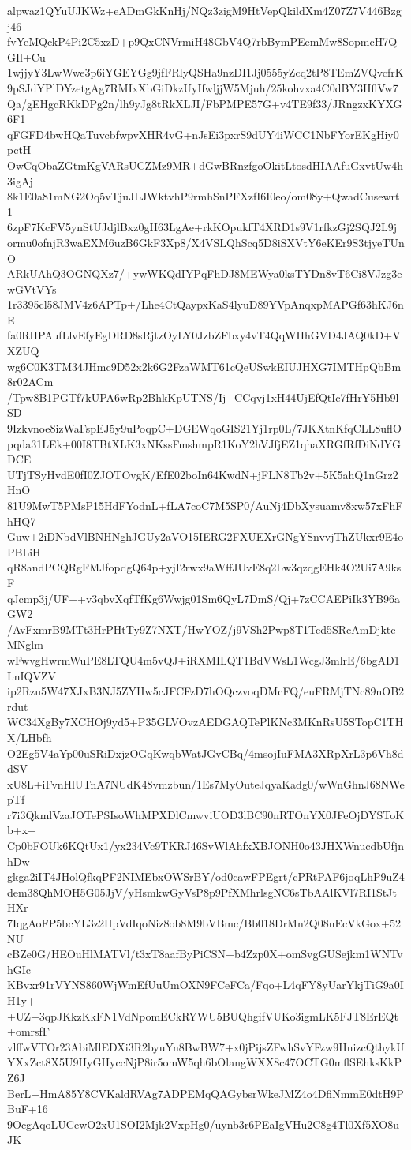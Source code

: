 alpwaz1QYuUJKWz+eADmGkKnHj/NQz3zigM9HtVepQkildXm4Z07Z7V446Bzgj46
fvYeMQckP4Pi2C5xzD+p9QxCNVrmiH48GbV4Q7rbBymPEemMw8SopmcH7QGIl+Cu
1wjjyY3LwWwe3p6iYGEYGg9jfFRlyQSHa9nzDI1Jj0555yZcq2tP8TEmZVQvcfrK
9pSJdYPlDYzetgAg7RMIxXbGiDkzUyIfwljjW5Mjuh/25kohvxa4C0dBY3HflVw7
Qa/gEHgcRKkDPg2n/lh9yJg8tRkXLJI/FbPMPE57G+v4TE9f33/JRngzxKYXG6F1
qFGFD4bwHQaTuvcbfwpvXHR4vG+nJsEi3pxrS9dUY4iWCC1NbFYorEKgHiy0pctH
OwCqObaZGtmKgVARsUCZMz9MR+dGwBRnzfgoOkitLtosdHIAAfuGxvtUw4h3igAj
8k1E0a81mNG2Oq5vTjuJLJWktvhP9rmhSnPFXzfI6I0eo/om08y+QwadCusewrt1
6zpF7KcFV5ynStUJdjlBxz0gH63LgAe+rkKOpukfT4XRD1s9V1rfkzGj2SQJ2L9j
ormu0ofnjR3waEXM6uzB6GkF3Xp8/X4VSLQhScq5D8iSXVtY6eKEr9S3tjyeTUnO
ARkUAhQ3OGNQXz7/+ywWKQdIYPqFhDJ8MEWya0ksTYDn8vT6Ci8VJzg3ewGVtVYs
1r3395cl58JMV4z6APTp+/Lhe4CtQaypxKaS4lyuD89YVpAnqxpMAPGf63hKJ6nE
fa0RHPAufLlvEfyEgDRD8sRjtzOyLY0JzbZFbxy4vT4QqWHhGVD4JAQ0kD+VXZUQ
wg6C0K3TM34JHmc9D52x2k6G2FzaWMT61cQeUSwkEIUJHXG7IMTHpQbBm8r02ACm
/Tpw8B1PGTf7kUPA6wRp2BhkKpUTNS/Ij+CCqvj1xH44UjEfQtIc7fHrY5Hb9lSD
9Izkvnoe8izWaFspEJ5y9uPoqpC+DGEWqoGIS21Yj1rp0L/7JKXtnKfqCLL8uflO
pqda31LEk+00I8TBtXLK3xNKssFmshmpR1KoY2hVJfjEZ1qhaXRGfRfDiNdYGDCE
UTjTSyHvdE0fI0ZJOTOvgK/EfE02boIn64KwdN+jFLN8Tb2v+5K5ahQ1nGrz2HnO
81U9MwT5PMsP15HdFYodnL+fLA7coC7M5SP0/AuNj4DbXysuamv8xw57xFhFhHQ7
Guw+2iDNbdVlBNHNghJGUy2aVO15IERG2FXUEXrGNgYSnvvjThZUkxr9E4oPBLiH
qR8andPCQRgFMJfopdgQ64p+yjI2rwx9aWffJUvE8q2Lw3qzqgEHk4O2Ui7A9ksF
qJcmp3j/UF++v3qbvXqfTfKg6Wwjg01Sm6QyL7DmS/Qj+7zCCAEPiIk3YB96aGW2
/AvFxmrB9MTt3HrPHtTy9Z7NXT/HwYOZ/j9VSh2Pwp8T1Tcd5SRcAmDjktcMNglm
wFwvgHwrmWuPE8LTQU4m5vQJ+iRXMILQT1BdVWsL1WcgJ3mlrE/6bgAD1LnIQVZV
ip2Rzu5W47XJxB3NJ5ZYHw5cJFCFzD7hOQczvoqDMcFQ/euFRMjTNc89nOB2rdut
WC34XgBy7XCHOj9yd5+P35GLVOvzAEDGAQTePlKNc3MKnRsU5STopC1THX/LHbfh
O2Eg5V4aYp00uSRiDxjzOGqKwqbWatJGvCBq/4msojIuFMA3XRpXrL3p6Vh8ddSV
xU8L+iFvnHlUTnA7NUdK48vmzbun/1Es7MyOuteJqyaKadg0/wWnGhnJ68NWepTf
r7i3QkmlVzaJOTePSIsoWhMPXDlCmwviUOD3lBC90nRTOnYX0JFeOjDYSToKb+x+
Cp0bFOUk6KQtUx1/yx234Vc9TKRJ46SvWlAhfxXBJONH0o43JHXWnucdbUfjnhDw
gkga2iIT4JHolQfkqPF2NIMEbxOWSrBY/od0cawFPEgrt/cPRtPAF6joqLhP9uZ4
dem38QhMOH5G05JjV/yHsmkwGyVsP8p9PfXMhrlsgNC6sTbAAlKVl7RI1StJtHXr
7IqgAoFP5bcYL3z2HpVdIqoNiz8ob8M9bVBmc/Bb018DrMn2Q08nEcVkGox+52NU
cBZe0G/HEOuHlMATVl/t3xT8aafByPiCSN+b4Zzp0X+omSvgGUSejkm1WNTvhGIc
KBvxr91rVYNS860WjWmEfUuUmOXN9FCeFCa/Fqo+L4qFY8yUarYkjTiG9a0IH1y+
+UZ+3qpJKkzKkFN1VdNpomECkRYWU5BUQhgifVUKo3igmLK5FJT8ErEQt+omrsfF
vlffwVTOr23AbiMlEDXi3R2byuYn8BwBW7+x0jPijsZFwhSvYFzw9HnizcQthykU
YXxZct8X5U9HyGHyccNjP8ir5omW5qh6bOlangWXX8c47OCTG0mflSEhksKkPZ6J
BerL+HmA85Y8CVKaldRVAg7ADPEMqQAGybsrWkeJMZ4o4DfiNmmE0dtH9PBuF+16
9OcgAqoLUCewO2xU1SOI2Mjk2VxpHg0/uynb3r6PEaIgVHu2C8g4Tl0Xf5XO8uJK
